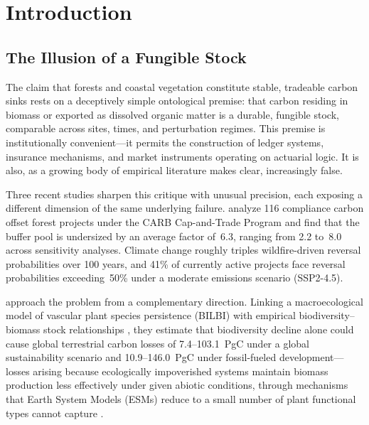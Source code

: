 \documentclass[12pt]{article}
\begin{document}
\begin{abstract}
failure is structurally a synchronization failure: $\tau_\text{institution}\gg
\tau_\text{ecology}$. We further develop a formal connection between decoupling
inequalities in Fourier restriction theory and the CLIO (Constraint-Local Inference on
Observables) framework, showing that the CARB buffer pool undercapitalization factor
of~6.3 is a measurement of the decoupling constant $D_\pi$ for the governance projection,
and that the critical exponent structure of decoupling theory corresponds precisely to the
resilience ratio phase transition $\mathcal{R}=1$ separating metastable persistence from
collapse cascade. The unified framework transforms three empirical failures into a
generative research program for constraint-indexed carbon governance.
\end{abstract}

\bigskip

\section{Introduction}

\subsection*{The Illusion of a Fungible Stock}

The claim that forests and coastal vegetation constitute stable, tradeable carbon sinks
rests on a deceptively simple ontological premise: that carbon residing in biomass or
exported as dissolved organic matter is a durable, fungible stock, comparable across sites,
times, and perturbation regimes. This premise is institutionally convenient---it permits
the construction of ledger systems, insurance mechanisms, and market instruments operating
on actuarial logic. It is also, as a growing body of empirical literature makes clear,
increasingly false.

Three recent studies sharpen this critique with unusual precision, each exposing a
different dimension of the same underlying failure. \citet{Wu2026} analyze 116 compliance
carbon offset forest projects under the CARB Cap-and-Trade Program and find that the buffer
pool is undersized by an average factor of~6.3, ranging from 2.2 to~8.0 across sensitivity
analyses. Climate change roughly triples wildfire-driven reversal probabilities over 100
years, and 41\% of currently active projects face reversal probabilities exceeding~50\%
under a moderate emissions scenario (SSP2-4.5).

\citet{Weiskopf2024} approach the problem from a complementary direction. Linking a
macroecological model of vascular plant species persistence (BILBI) with empirical
biodiversity--biomass stock relationships \citep{OConnor2017}, they estimate that
biodiversity decline alone could cause global terrestrial carbon losses of
7.4--103.1~PgC under a global sustainability scenario and 10.9--146.0~PgC under
fossil-fueled development---losses arising because ecologically impoverished systems
maintain biomass production less effectively under given abiotic conditions, through
mechanisms that Earth System Models (ESMs) reduce to a small number of plant functional
types cannot capture \citep{Ferrier2016}.
\end{document}
